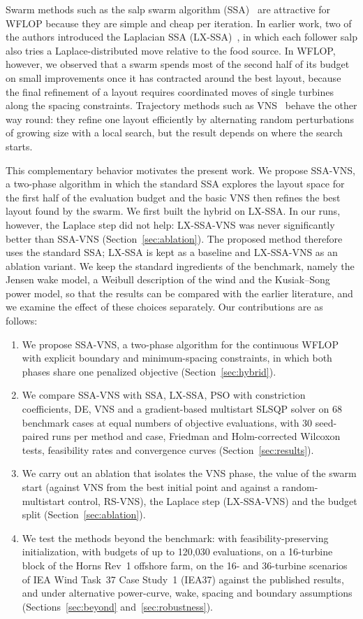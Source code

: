 \documentclass[journal,twoside]{IEEEtran}
\begin{document}
Swarm methods such as the salp swarm algorithm (SSA)~\cite{Mirjalili2017} are attractive for WFLOP because they are simple and cheap per iteration. In earlier work, two of the authors introduced the Laplacian SSA (LX-SSA)~\cite{Solanki2023}, in which each follower salp also tries a Laplace-distributed move relative to the food source. In WFLOP, however, we observed that a swarm spends most of the second half of its budget on small improvements once it has contracted around the best layout, because the final refinement of a layout requires coordinated moves of single turbines along the spacing constraints. Trajectory methods such as VNS~\cite{Mladenovic1997,Hansen2001} behave the other way round: they refine one layout efficiently by alternating random perturbations of growing size with a local search, but the result depends on where the search starts.

This complementary behavior motivates the present work. We propose SSA-VNS, a two-phase algorithm in which the standard SSA explores the layout space for the first half of the evaluation budget and the basic VNS then refines the best layout found by the swarm. We first built the hybrid on LX-SSA. In our runs, however, the Laplace step did not help: LX-SSA-VNS was never significantly better than SSA-VNS (Section~\ref{sec:ablation}). The proposed method therefore uses the standard SSA; LX-SSA is kept as a baseline and LX-SSA-VNS as an ablation variant. We keep the standard ingredients of the benchmark, namely the Jensen wake model, a Weibull description of the wind and the Kusiak--Song power model, so that the results can be compared with the earlier literature, and we examine the effect of these choices separately. Our contributions are as follows:
\begin{enumerate}
\item We propose SSA-VNS, a two-phase algorithm for the continuous WFLOP with explicit boundary and minimum-spacing constraints, in which both phases share one penalized objective (Section~\ref{sec:hybrid}).
\item We compare SSA-VNS with SSA, LX-SSA, PSO with constriction coefficients, DE, VNS and a gradient-based multistart SLSQP solver on 68 benchmark cases at equal numbers of objective evaluations, with 30 seed-paired runs per method and case, Friedman and Holm-corrected Wilcoxon tests, feasibility rates and convergence curves (Section~\ref{sec:results}).
\item We carry out an ablation that isolates the VNS phase, the value of the swarm start (against VNS from the best initial point and against a random-multistart control, RS-VNS), the Laplace step (LX-SSA-VNS) and the budget split (Section~\ref{sec:ablation}).
\item We test the methods beyond the benchmark: with feasibility-preserving initialization, with budgets of up to 120,030 evaluations, on a 16-turbine block of the Horns Rev~1 offshore farm, on the 16- and 36-turbine scenarios of IEA Wind Task~37 Case Study~1 (IEA37) against the published results, and under alternative power-curve, wake, spacing and boundary assumptions (Sections~\ref{sec:beyond} and~\ref{sec:robustness}).
\end{enumerate}
\end{document}
